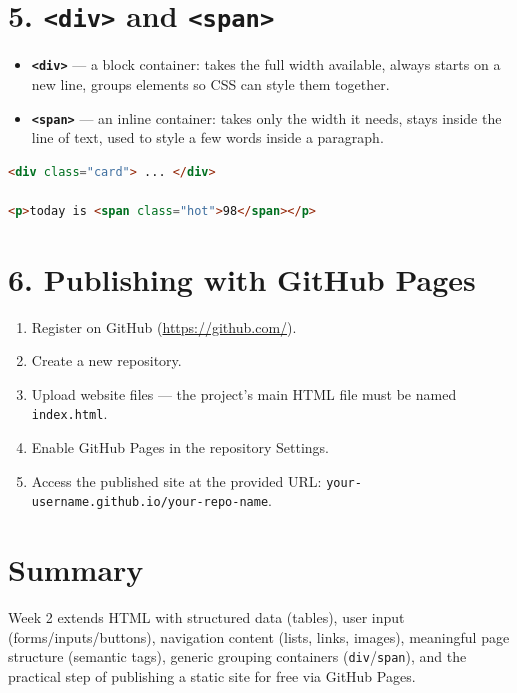 \documentclass[12pt]{article}
\begin{document}
\section{5. \texttt{<div>} and \texttt{<span>}}
\begin{itemize}
    \item \textbf{\texttt{<div>}} — a block container: takes the full width available, always starts on a new line, groups elements so CSS can style them together.
    \item \textbf{\texttt{<span>}} — an inline container: takes only the width it needs, stays inside the line of text, used to style a few words inside a paragraph.
\end{itemize}
\begin{lstlisting}[language=HTML]
<div class="card"> ... </div>

<p>today is <span class="hot">98</span></p>
\end{lstlisting}

\section{6. Publishing with GitHub Pages}
\begin{enumerate}
    \item Register on GitHub (\url{https://github.com/}).
    \item Create a new repository.
    \item Upload website files — the project's main HTML file must be named \texttt{index.html}.
    \item Enable GitHub Pages in the repository Settings.
    \item Access the published site at the provided URL: \texttt{your-username.github.io/your-repo-name}.
\end{enumerate}

\section{Summary}
Week 2 extends HTML with structured data (tables), user input (forms/inputs/buttons), navigation content (lists, links, images), meaningful page structure (semantic tags), generic grouping containers (\texttt{div}/\texttt{span}), and the practical step of publishing a static site for free via GitHub Pages.
\end{document}
